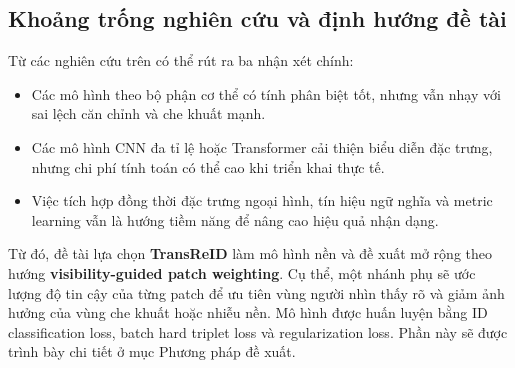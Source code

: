 \subsection{Khoảng trống nghiên cứu và định hướng đề tài}
Từ các nghiên cứu trên có thể rút ra ba nhận xét chính:
\begin{itemize}
    \item Các mô hình theo bộ phận cơ thể có tính phân biệt tốt, nhưng vẫn nhạy với sai lệch căn chỉnh và che khuất mạnh.
    \item Các mô hình CNN đa tỉ lệ hoặc Transformer cải thiện biểu diễn đặc trưng, nhưng chi phí tính toán có thể cao khi triển khai thực tế.
    \item Việc tích hợp đồng thời đặc trưng ngoại hình, tín hiệu ngữ nghĩa và metric learning vẫn là hướng tiềm năng để nâng cao hiệu quả nhận dạng.
\end{itemize}

Từ đó, đề tài lựa chọn \textbf{TransReID} \cite{he2021transreidtransformerbasedobjectreidentification} làm mô hình nền và đề xuất mở rộng theo hướng \textbf{visibility-guided patch weighting}. Cụ thể, một nhánh phụ sẽ ước lượng độ tin cậy của từng patch để ưu tiên vùng người nhìn thấy rõ và giảm ảnh hưởng của vùng che khuất hoặc nhiễu nền. Mô hình được huấn luyện bằng ID classification loss, batch hard triplet loss và regularization loss. Phần này sẽ được trình bày chi tiết ở mục Phương pháp đề xuất.
